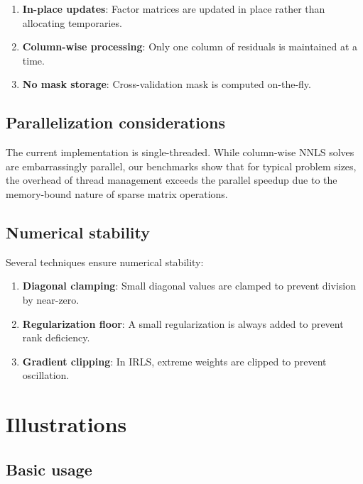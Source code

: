 \documentclass[11pt]{article}
\begin{document}
\begin{enumerate}
  \item \textbf{In-place updates}: Factor matrices are updated in place rather 
  than allocating temporaries.
  \item \textbf{Column-wise processing}: Only one column of residuals is 
  maintained at a time.
  \item \textbf{No mask storage}: Cross-validation mask is computed on-the-fly.
\end{enumerate}

\subsection{Parallelization considerations}

The current implementation is single-threaded. While column-wise NNLS solves are 
embarrassingly parallel, our benchmarks show that for typical problem sizes, the 
overhead of thread management exceeds the parallel speedup due to the memory-bound 
nature of sparse matrix operations.

\subsection{Numerical stability}

Several techniques ensure numerical stability:

\begin{enumerate}
  \item \textbf{Diagonal clamping}: Small diagonal values are clamped to prevent 
  division by near-zero.
  \item \textbf{Regularization floor}: A small regularization is always added to 
  prevent rank deficiency.
  \item \textbf{Gradient clipping}: In IRLS, extreme weights are clipped to 
  prevent oscillation.
\end{enumerate}


\section{Illustrations} \label{sec:illustrations}

\subsection{Basic usage}
\end{document}
